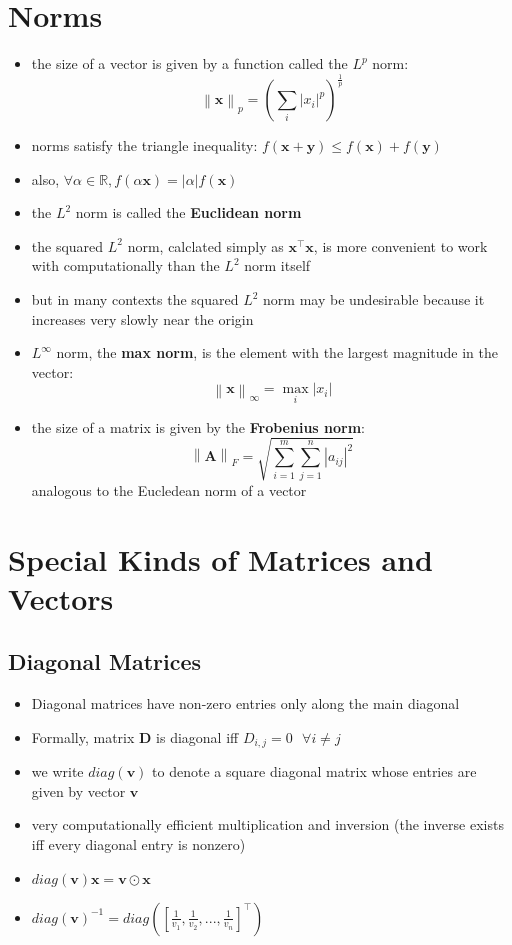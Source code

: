 \documentclass[11pt,twocolumn]{report}
\def\realnumbers{\mathbb{R}}
\newcommand{\norm}[1]{\left\lVert#1\right\rVert}
\begin{document}
\section{Norms}
\begin{itemize}
  \item the size of a vector is given by a function called the $L^p$ norm:
    \begin{equation}
      \norm{\bm{x}}_p = (\sum_i {\lvert x_i \rvert}^p)^{\frac{1}{p}}
    \end{equation}
  \item norms satisfy the triangle inequality: $f(\bm{x} + \bm{y}) \leq
    f(\bm{x}) + f(\bm{y})$
  \item also, $\forall \alpha \in \realnumbers, f(\alpha\bm{x}) =
    |\alpha|f(\bm{x})$
  \item the $L^2$ norm is called the \textbf{Euclidean norm}
  \item the squared $L^2$ norm, calclated simply as $\bm{x}^\intercal\bm{x}$, is
    more convenient to work with computationally than the $L^2$ norm itself
  \item but in many contexts the squared $L^2$ norm may be undesirable because
    it increases very slowly near the origin
  \item $L^\infty$ norm, the \textbf{max norm}, is the element with the largest
    magnitude in the vector:
    \begin{equation}
      \norm{\bm{x}}_\infty = \max_i |x_i|
    \end{equation}
  \item the size of a matrix is given by the \textbf{Frobenius norm}:
    \begin{equation}
      \norm{\bm{A}}_F = \sqrt{\sum_{i=1}^m\sum_{j=1}^n|a_{ij}|^2}
    \end{equation}
    analogous to the Eucledean norm of a vector
\end{itemize}

\section{Special Kinds of Matrices and Vectors}
\subsection{Diagonal Matrices}
\begin{itemize}
  \item Diagonal matrices have non-zero entries only along the main
    diagonal
  \item Formally, matrix $\bm{D}$ is diagonal iff $D_{i, j} = 0 \text{  }
    \forall i \neq j$
  \item we write $diag(\bm{v})$ to denote a square diagonal matrix whose
    entries are given by vector $\bm{v}$
  \item very computationally efficient multiplication and inversion (the
    inverse exists iff every diagonal entry is nonzero)
  \item $diag(\bm{v})\bm{x} = \bm{v} \odot \bm{x}$
  \item $diag(\bm{v})^{-1} =
    diag([\frac{1}{v_1},\frac{1}{v_2},...,\frac{1}{v_n}]^\intercal)$

\end{itemize}
\end{document}
